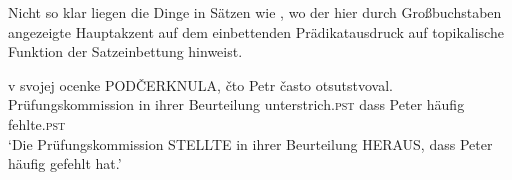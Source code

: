 \documentclass[output=paper]{langscibook}
\begin{document}
\begin{otherlanguage}{german}
\noindent Nicht so klar liegen die Dinge in Sätzen wie , wo der hier durch Großbuchstaben angezeigte Hauptakzent auf dem einbettenden Prädikatausdruck auf to\-pi\-ka\-lische Funktion der Satzeinbettung hinweist.

\ea \label{ex:zi83:60}
     v svojej ocenke PODČERKNULA, čto Petr často otsutstvoval. \\
    Prüfungskommission in ihrer Beurteilung unterstrich.\textsc{pst} dass Peter häufig fehlte.\textsc{pst} \\
    \glt ‘Die Prüfungskommission STELLTE in ihrer Beurteilung HERAUS, dass Peter häufig gefehlt hat.’
\z


    


    


\end{otherlanguage}
\end{document}
